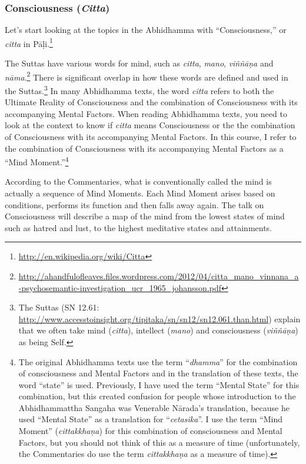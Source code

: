 \subsubsection*{Consciousness (\textit{Citta})}

Let’s start looking at the topics in the Abhidhamma with “Consciousness,” or \textit{citta} in Pāḷi.\footnote{\url{http://en.wikipedia.org/wiki/Citta}}

The Suttas have various words for mind, such as \textit{citta}, \textit{mano}, \textit{viññāṇa} and \textit{nāma}.\footnote{\url{http://ahandfulofleaves.files.wordpress.com/2012/04/citta_mano_vinnana_a-psychosemantic-investigation_ucr_1965_johansson.pdf}} There is significant overlap in how these words are defined and used in the Suttas.\footnote{The Suttas (SN 12.61: \url{http://www.accesstoinsight.org/tipitaka/sn/sn12/sn12.061.than.html}) explain that we often take mind (\textit{citta}), intellect (\textit{mano}) and consciousness (\textit{viññāṇa}) as being Self.} In many Abhidhamma texts, the word \textit{citta} refers to both the Ultimate Reality of Consciousness and the combination of Consciousness with its accompanying Mental Factors. When reading Abhidhamma texts, you need to look at the context to know if \textit{citta} means Consciousness or the the combination of Consciousness with its accompanying Mental Factors. In this course, I refer to the combination of Consciousness with its accompanying Mental Factors as a “Mind Moment.”\footnote{The original Abhidhamma texts use the term “\textit{dhamma}” for the combination of consciousness and Mental Factors and in the translation of these texts, the word “state” is used. Previously, I have used the term “Mental State” for this combination, but this created confusion for people whose introduction to the Abhidhammattha Sangaha was Venerable Nārada’s translation, because he used “Mental State” as a translation for “\textit{cetasika}”. I use the term “Mind Moment” (\textit{cittakkhaṇa}) for this combination of consciousness and Mental Factors, but you should not think of this as a measure of time (unfortunately, the Commentaries do use the term \textit{cittakkhaṇa} as a measure of time).} 

According to the Commentaries, what is conventionally called the mind is actually a sequence of Mind Moments. Each Mind Moment arises based on conditions, performs its function and then falls away again. The talk on Consciousness will describe a map of the mind from the lowest states of mind such as hatred and lust, to the highest meditative states and attainments.

